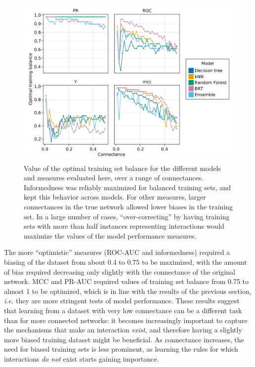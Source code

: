 \documentclass[11pt]{article}
\makeatletter
\def\maxwidth{\ifdim\Gin@nat@width>\linewidth\linewidth
\else\Gin@nat@width\fi}
\let\Oldincludegraphics\includegraphics
\renewcommand{\includegraphics}[1]{\Oldincludegraphics[width=\maxwidth]{#1}}
\makeatother
\begin{document}
\begin{figure}
\hypertarget{fig:optimbias}{%
\centering
\includegraphics{figures/optimal_bias.png}
\caption{Value of the optimal training set balance for the different
models and measures evaluated here, over a range of connectances.
Informedness was reliably maximized for balanced training sets, and kept
this behavior across models. For other measures, larger connectances in
the true network allowed lower biases in the training set. In a large
number of cases, ``over-correcting'' by having training sets with more
than half instances representing interactions would maximize the values
of the model performance measures.}\label{fig:optimbias}
}
\end{figure}

The more ``optimistic'' measures (ROC-AUC and informedness) required a
biasing of the dataset from about 0.4 to 0.75 to be maximized, with the
amount of bias required decreasing only slightly with the connectance of
the original network. MCC and PR-AUC required values of training set
balance from 0.75 to almost 1 to be optimized, which is in line with the
results of the previous section, \emph{i.e.} they are more stringent
tests of model performance. These results suggest that learning from a
dataset with very low connectance can be a different task than for more
connected networks: it becomes increasingly important to capture the
mechanisms that make an interaction \emph{exist}, and therefore having a
slightly more biased training dataset might be beneficial. As
connectance increases, the need for biased training sets is less
prominent, as learning the rules for which interactions \emph{do not}
exist starts gaining importance.
\end{document}

